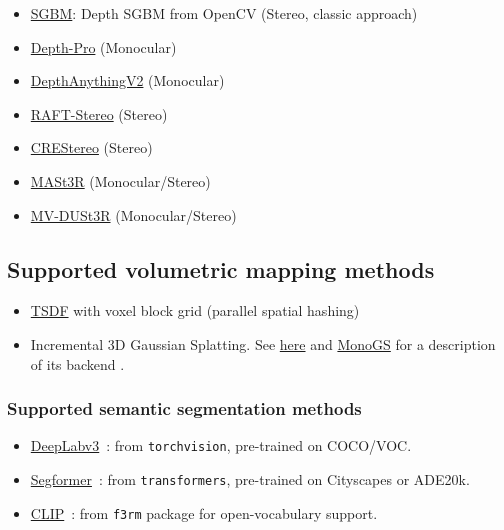 \documentclass{article}
\providecommand{\tightlist}{%
  \setlength{\itemsep}{0pt}\setlength{\parskip}{0pt}}
\begin{document}
\begin{itemize}
\tightlist
\item
  \href{https://ieeexplore.ieee.org/document/4359315}{SGBM}: Depth SGBM
  from OpenCV (Stereo, classic approach) \cite{hirschmuller2007stereo}
\item
  \href{https://arxiv.org/abs/2410.02073}{Depth-Pro} (Monocular) \cite{depthpro2023}
\item
  \href{https://arxiv.org/abs/2406.09414}{DepthAnythingV2} (Monocular) \cite{depthanythingv2_2024}
\item
  \href{https://arxiv.org/abs/2109.07547}{RAFT-Stereo} (Stereo) \cite{teed2021raft}
\item
  \href{https://arxiv.org/abs/2203.11483}{CREStereo} (Stereo) \cite{li2022cres}
\item
  \href{https://arxiv.org/abs/2406.09756}{MASt3R} (Monocular/Stereo) \cite{master}
\item
  \href{https://arxiv.org/abs/2412.06974}{MV-DUSt3R} (Monocular/Stereo) \cite{mvduster}    
\end{itemize}

\hypertarget{supported-volumetric-mapping-methods}{%
\subsection{Supported volumetric mapping
methods}\label{supported-volumetric-mapping-methods}}

\begin{itemize}
\tightlist
\item
  \href{https://arxiv.org/pdf/2110.00511}{TSDF} with voxel block grid
  (parallel spatial hashing)~\cite{dong2022ash}
\item
  Incremental 3D Gaussian Splatting. See
  \href{https://repo-sam.inria.fr/fungraph/3d-gaussian-splatting/}{here}
  and \href{https://arxiv.org/abs/2312.06741}{MonoGS} for a description
  of its backend \cite{matsuki2023gaussian, kerbl20233d}.
\end{itemize}

\hypertarget{supported-semantic-segmentation-methods}{%
\subsubsection{Supported semantic segmentation
methods}\label{supported-semantic-segmentation-methods}}

\begin{itemize}
\tightlist
\item
  \href{https://arxiv.org/abs/1706.05587}{DeepLabv3}~\cite{chen2017rethinking}: from \texttt{torchvision}, pre-trained on COCO/VOC.
\item
  \href{https://arxiv.org/abs/2105.15203}{Segformer}~\cite{xie2021segformer}: from \texttt{transformers}, pre-trained on Cityscapes or ADE20k.
\item
  \href{https://arxiv.org/abs/2212.09506}{CLIP}~\cite{lin2023clip}: from \texttt{f3rm} package for open-vocabulary support.
\end{itemize}
\end{document}
